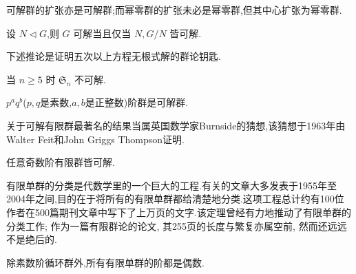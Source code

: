 可解群的扩张亦是可解群;而幂零群的扩张未必是幂零群,但其中心扩张为幂零群.
\begin{proposition}
	设 $N \lhd G$,则 $G$ 可解当且仅当 $N,G/N$ 皆可解.
\end{proposition}

下述推论是证明五次以上方程无根式解的群论钥匙.
\begin{corollary}\label{prop:S_n-unsolvable}
	当 $n \geq 5$ 时 $\mathfrak{S}_n$ 不可解.
\end{corollary}


\begin{theorem}[Burnside $p^aq^b$定理]
	$p^aq^b$($p,q$是素数,$a,b$是正整数)阶群是可解群.
\end{theorem}

关于可解有限群最著名的结果当属英国数学家Burnside的猜想,该猜想于1963年由Walter Feit和John Griggs Thompson证明.
\begin{theorem}\label{thm:Feit-Thompson}
	任意奇数阶有限群皆可解.
\end{theorem}

有限单群的分类是代数学里的一个巨大的工程.有关的文章大多发表于1955年至2004年之间,目的在于将所有的有限单群都给清楚地分类.这项工程总计约有100位作者在500篇期刊文章中写下了上万页的文字.该定理曾经有力地推动了有限单群的分类工作; 作为一篇有限群论的论文, 其255页的长度与繁复亦属空前, 然而还远远不是绝后的.
\begin{corollary}
	除素数阶循环群外,所有有限单群的阶都是偶数.
\end{corollary}
